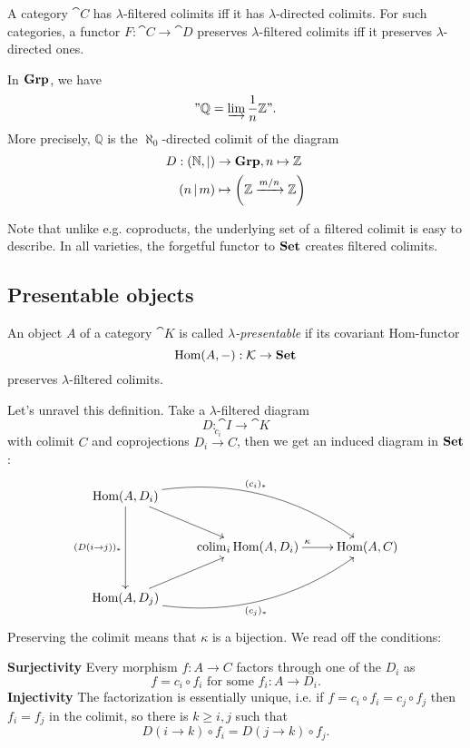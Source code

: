 \begin{Proposition}A category $\cat C$ has $\lambda$-filtered colimits iff it has $\lambda$-directed colimits. For such categories, a functor $F : \cat C \to \cat D$ preserves $\lambda$-filtered colimits iff it preserves $\lambda$-directed ones.
\end{Proposition}

\begin{Example}\label{ex:Q}
In $\mathbf{Grp}$, we have 
\[ "\mathbb Q = \varinjlim \frac 1 n \mathbb Z". \]
More precisely, $\mathbb Q$ is the $\aleph_0$-directed colimit of the diagram
\begin{align*}
 D : (\mathbb N, |) &\to \mathbf{Grp}, n \mapsto \mathbb Z \\
 (n\, | \,m) &\mapsto \left(\mathbb Z \xrightarrow{m/n} \mathbb Z\right)
\end{align*}
\end{Example}

Note that unlike e.g. coproducts, the underlying set of a filtered colimit is easy to describe. In all varieties, the forgetful functor to $\mathbf{Set}$ creates filtered colimits.

\subsection{Presentable objects}
\begin{Definition}
An object $A$ of a category $\cat K$ is called \emph{$\lambda$-presentable} if its covariant Hom-functor 
\[ \textrm{Hom}(A,-) : \mathcal{K} \to \mathbf{Set} \]
preserves $\lambda$-filtered colimits.
\end{Definition}
Let's unravel this definition. Take a $\lambda$-filtered diagram
\[ D : \cat I \to \cat K \]
with colimit $C$ and coprojections $D_i \xrightarrow{c_i} C$, then we get an induced diagram in $\mathbf{Set}$:
\[
\xymatrix{
\hom(A,D_i) \ar[rd] \ar[dd]_{(D(i \to j))_*} \ar@/^2pc/[rrd]^{(c_i)_*} \\
& \colim_i \hom(A,D_i) \ar[r]^{\kappa} & \hom(A,C) \\
\hom(A,D_j) \ar[ru] \ar@/_2pc/[rru]_{(c_j)_*} \\
}\]
Preserving the colimit means that $\kappa$ is a bijection. We read off the conditions:

\textbf{Surjectivity} Every morphism $f : A \to C$ factors through one of the $D_i$ as
\begin{equation}
f = c_i \circ f_i \text { for some } f_i : A \to D_i.
\end{equation}
\textbf{Injectivity} The factorization is essentially unique, i.e. if $f = c_i\circ  f_i = c_j\circ  f_j$ then $f_i = f_j$ in the colimit, so there is $k \geq i,j$ such that
\begin{equation}
D(i \to k) \circ f_i = D(j \to k) \circ f_j.
\end{equation}


